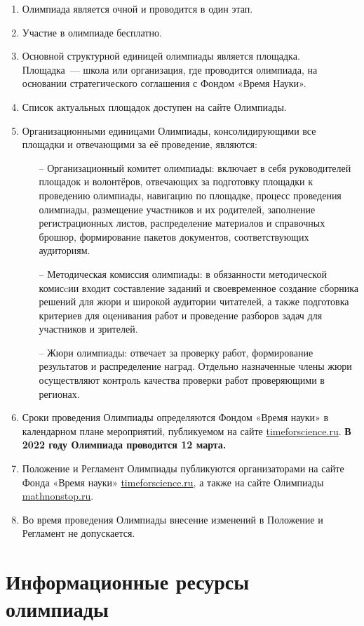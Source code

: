 \documentclass[a4paper,12pt]{article}
\newcommand{\surl}[1]{{\small\url{#1}}}
\begin{document}
\begin{enumerate}
	\item Олимпиада является очной и проводится в один этап.
	\item Участие в олимпиаде бесплатно.
	\item Основной структурной единицей олимпиады является площадка. Площадка~— школа или организация, где проводится олимпиада, на основании стратегического соглашения с Фондом «Время Науки».
	\item Список актуальных площадок доступен на сайте Олимпиады.
	\item Организационными единицами Олимпиады, консолидирующими все площадки и отвечающими за её проведение, являются: \begin{enumerate}
	   \item[–] Организационный комитет олимпиады: включает в себя руководителей площадок и волонтёров, отвечающих за подготовку площадки к проведению олимпиады, навигацию по площадке, процесс проведения олимпиады, размещение участников и их родителей, заполнение регистрационных листов, распределение материалов и справочных брошюр, формирование пакетов документов, соответствующих аудиториям.
	   \item[–] Методическая комиссия олимпиады: в обязанности методической комисcии входит составление заданий и своевременное создание сборника решений для жюри и широкой аудитории читателей, а также подготовка критериев для оценивания работ и проведение разборов задач для участников и зрителей.
	   \item[–] Жюри олимпиады: отвечает за проверку работ, формирование результатов и распределение наград. Отдельно назначенные члены жюри осуществляют контроль качества проверки работ проверяющими в регионах.
   \end{enumerate}
	\item Сроки проведения Олимпиады определяются Фондом «Время науки» в календарном плане мероприятий, публикуемом на сайте \surl{timeforscience.ru}. {\bf В 2022 году Олимпиада проводится 12 марта.}
	\item Положение и Регламент Олимпиады публикуются организаторами на сайте Фонда «Время науки» \surl{timeforscience.ru}, а также на сайте Олимпиады \surl{mathnonstop.ru}.
	\item Во время проведения Олимпиады внесение изменений в Положение и Регламент не допускается.
\end{enumerate}

\section{Информационные ресурсы олимпиады}
\end{document}

